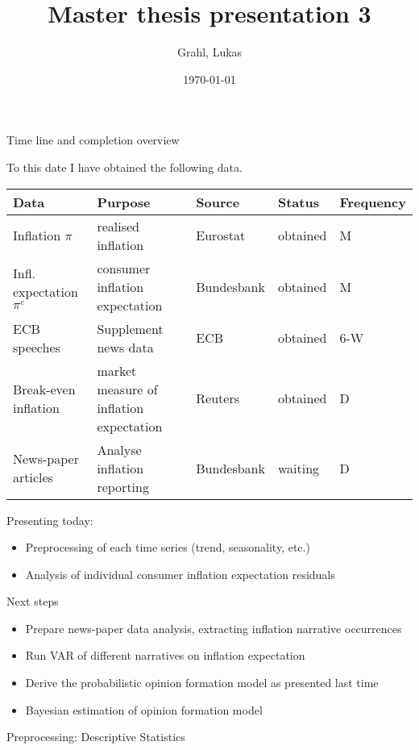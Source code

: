\documentclass[9pt]{beamer}
\title{Master thesis presentation 3}
\author{Grahl, Lukas}
\institute{Paris 1: Panthéon Sorbonne}
\date{\today}
\begin{document}
	
	\maketitle
	
	\begin{frame}{Time line and completion overview}
		
		To this date I have obtained the following data.
		\begin{center}
			\tiny{
				\begin{tabular}{l|llll}
				Data & Purpose & Source & Status & Frequency \\
				\hline
				Inflation $\pi$& realised inflation & Eurostat & obtained & M \\
				Infl. expectation $\pi^e$ & consumer inflation expectation & Bundesbank & obtained & M \\
				ECB speeches & Supplement news data & ECB & obtained & 6-W \\
				Break-even inflation & market measure of inflation expectation & Reuters & obtained & D \\
				News-paper articles & Analyse inflation reporting & Bundesbank & waiting & D \\							
				\end{tabular}
			}	
		\end{center}	
		Presenting today: 
		\begin{itemize}
				\item Preprocessing of each time series (trend, seasonality, etc.)
				\item Analysis of individual consumer inflation expectation residuals
		\end{itemize}
	
		Next steps
		\begin{itemize}
			\item Prepare news-paper data analysis, extracting inflation narrative occurrences
			\item Run VAR of different narratives on inflation expectation
			\item Derive the probabilistic opinion formation model as presented last time
			\item Bayesian estimation of opinion formation model
		\end{itemize}
		
	\end{frame}

	\begin{frame}{Preprocessing: Descriptive Statistics}
	\end{frame}
\end{document}
